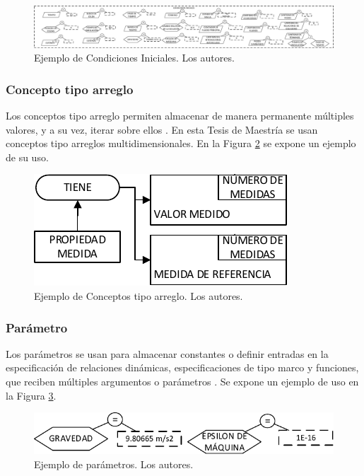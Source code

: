 \begin{figure}[h]
	\centering%
	\includegraphics[width=0.9\linewidth]{Fig/EjInitialConditions.pdf}%
	\caption[Ejemplo de Condiciones Iniciales.]{Ejemplo de Condiciones Iniciales. Los autores.} \label{fig:EjInitialConditions}
\end{figure}

\subsubsection{Concepto tipo arreglo}
Los conceptos tipo arreglo permiten almacenar de manera permanente múltiples valores, y a su vez, iterar sobre ellos \citep{JCalle}. En esta Tesis de Maestría se usan conceptos tipo arreglos multidimensionales. En la Figura \ref{fig:EjArrConcept} se expone un ejemplo de su uso.

\begin{figure}[h]
	\centering%
	\includegraphics[scale=1]{Fig/EjArrConcepts.pdf}%
	\caption[Ejemplo de Conceptos tipo arreglo.]{Ejemplo de Conceptos tipo arreglo. Los autores.} \label{fig:EjArrConcept}
\end{figure}

\subsubsection{Parámetro}
Los parámetros se usan para almacenar constantes o definir entradas en la especificación de relaciones dinámicas, especificaciones de tipo marco y funciones, que reciben múltiples argumentos o parámetros \citep{JCalle, norena2018det}. Se expone un ejemplo de uso en la Figura \ref{fig:EjParameter}.\\

\begin{figure}[h]
	\centering%
	\includegraphics[width=0.5\linewidth]{Fig/EjParametro.pdf}%
	\caption[Ejemplo de parámetros.]{Ejemplo de parámetros. Los autores.} \label{fig:EjParameter}
\end{figure}

